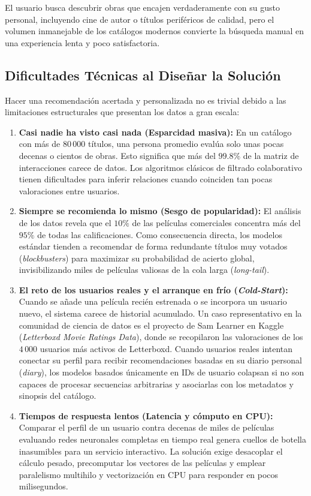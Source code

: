 \documentclass[a4paper,11pt]{article}
\begin{document}
El usuario busca descubrir obras que encajen verdaderamente con su gusto personal, incluyendo cine de autor o títulos periféricos de calidad, pero el volumen inmanejable de los catálogos modernos convierte la búsqueda manual en una experiencia lenta y poco satisfactoria.

\subsection{Dificultades Técnicas al Diseñar la Solución}
Hacer una recomendación acertada y personalizada no es trivial debido a las limitaciones estructurales que presentan los datos a gran escala:

\begin{enumerate}
    \item \textbf{Casi nadie ha visto casi nada (Esparcidad masiva):} En un catálogo con más de $80\,000$ títulos, una persona promedio evalúa solo unas pocas decenas o cientos de obras. Esto significa que más del $99.8\%$ de la matriz de interacciones carece de datos. Los algoritmos clásicos de filtrado colaborativo tienen dificultades para inferir relaciones cuando coinciden tan pocas valoraciones entre usuarios.
    
    \item \textbf{Siempre se recomienda lo mismo (Sesgo de popularidad):} El análisis de los datos revela que el $10\%$ de las películas comerciales concentra más del $95\%$ de todas las calificaciones. Como consecuencia directa, los modelos estándar tienden a recomendar de forma redundante títulos muy votados (\textit{blockbusters}) para maximizar su probabilidad de acierto global, invisibilizando miles de películas valiosas de la cola larga (\textit{long-tail}).
    
    \item \textbf{El reto de los usuarios reales y el arranque en frío (\textit{Cold-Start}):} Cuando se añade una película recién estrenada o se incorpora un usuario nuevo, el sistema carece de historial acumulado. Un caso representativo en la comunidad de ciencia de datos es el proyecto de Sam Learner en Kaggle (\textit{Letterboxd Movie Ratings Data}), donde se recopilaron las valoraciones de los $4\,000$ usuarios más activos de Letterboxd. Cuando usuarios reales intentan conectar su perfil para recibir recomendaciones basadas en su diario personal (\textit{diary}), los modelos basados únicamente en IDs de usuario colapsan si no son capaces de procesar secuencias arbitrarias y asociarlas con los metadatos y sinopsis del catálogo.
    
    \item \textbf{Tiempos de respuesta lentos (Latencia y cómputo en CPU):} Comparar el perfil de un usuario contra decenas de miles de películas evaluando redes neuronales completas en tiempo real genera cuellos de botella inasumibles para un servicio interactivo. La solución exige desacoplar el cálculo pesado, precomputar los vectores de las películas y emplear paralelismo multihilo y vectorización en CPU para responder en pocos milisegundos.
\end{enumerate}
\end{document}
